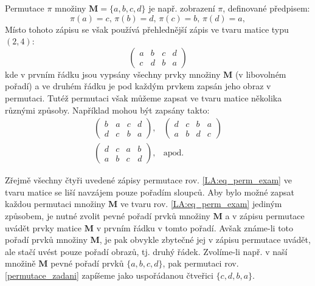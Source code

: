       \begin{example}%
        Permutace \(\pi\) množiny \(\mathbf{M}= \lbrace a,b,c,d\rbrace\) je např. zobrazení 
        \(\pi\), definované předpisem:
        \begin{equation}\label{permutace_zadani}
          \pi\left(a\right) = c, \,
          \pi\left(b\right) = d, \,
          \pi\left(c\right) = b, \,
          \pi\left(d\right) = a,
        \end{equation}
        Místo tohoto zápisu se však používá přehlednější zápis ve tvaru matice typu \((2,4)\):
        \begin{equation}\label{LA:eq_perm_exam}
            \begin{pmatrix}
            a & b & c & d \\
            c & d & b & a
            \end{pmatrix}
        \end{equation}
        kde v prvním řádku jsou vypsány všechny prvky množiny \(\mathbf{M}\) (v libovolném pořadí) 
        a ve druhém řádku je pod každým prvkem zapsán jeho obraz v permutaci. Tutéž permutaci však 
        můžeme zapsat ve tvaru matice několika různými způsoby. Například mohou být zapsány takto:
        \begin{equation}
          \begin{array}{cc}
            \begin{pmatrix}
              b & a & c & d \\
              d & c & b & a
            \end{pmatrix},         & 
            \begin{pmatrix}
              d & c & b & a \\
              a & b & d & c
            \end{pmatrix}          \\
            \begin{pmatrix}
              d & c & a & b \\
              a & b & c & d
            \end{pmatrix},         &
            \text{apod.}
          \end{array}
        \end{equation}
      \end{example}

      Zřejmě všechny čtyři uvedené zápisy permutace rov. \ref{LA:eq_perm_exam} ve tvaru matice se 
      liší navzájem pouze pořadím sloupců. Aby bylo možné zapsat každou permutaci množiny 
      \(\mathbf{M}\) ve tvaru rov. \ref{LA:eq_perm_exam} jediným způsobem, je nutné zvolit pevné 
      pořadí prvků množiny \(\mathbf{M}\)  a v zápisu permutace uvádět prvky matice \(\mathbf{M}\)  
      v prvním řádku v tomto pořadí. Avšak známe-li toto pořadí prvků množiny \(\mathbf{M}\), je 
      pak  obvykle zbytečné jej v zápisu permutace uvádět, ale stačí uvést pouze pořadí obrazů, tj. 
      druhý řádek. Zvolíme-li např. v naší množině \(\mathbf{M}\) pevné pořadí prvků \(\lbrace 
      a,b,c,d\rbrace\), pak permutaci rov. \ref{permutace_zadani} zapíšeme jako uspořádanou 
      čtveřici \(\lbrace c,d,b,a\rbrace\).
  
